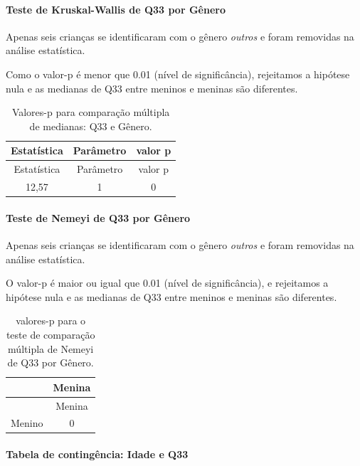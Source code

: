 \documentclass[]{article}
\let\oldparagraph\paragraph
\renewcommand{\paragraph}[1]{\oldparagraph{#1}\mbox{}}
\begin{document}
\hypertarget{teste-de-kruskal-wallis-de-q33-por-guxeanero}{%
\paragraph{Teste de Kruskal-Wallis de Q33 por Gênero}\label{teste-de-kruskal-wallis-de-q33-por-guxeanero}}

Apenas seis crianças se identificaram com o gênero \emph{outros} e foram removidas na análise estatística.

Como o valor-p é menor que 0.01 (nível de significância), rejeitamos a hipótese nula e as medianas de Q33 entre meninos e meninas são diferentes.

\begin{longtable}[]{@{}ccc@{}}
\caption{\label{tab:unnamed-chunk-1150}Valores-p para comparação múltipla de medianas: Q33 e Gênero.}\tabularnewline
\toprule
Estatística & Parâmetro & valor p\tabularnewline
\midrule
\endfirsthead
\toprule
Estatística & Parâmetro & valor p\tabularnewline
\midrule
\endhead
12,57 & 1 & 0\tabularnewline
\bottomrule
\end{longtable}

\hypertarget{teste-de-nemeyi-de-q33-por-guxeanero}{%
\paragraph{Teste de Nemeyi de Q33 por Gênero}\label{teste-de-nemeyi-de-q33-por-guxeanero}}

Apenas seis crianças se identificaram com o gênero \emph{outros} e foram removidas na análise estatística.

O valor-p é maior ou igual que 0.01 (nível de significância), e rejeitamos a hipótese nula e as medianas de Q33 entre meninos e meninas são diferentes.

\begin{longtable}[]{@{}lc@{}}
\caption{\label{tab:unnamed-chunk-1152}valores-p para o teste de comparação múltipla de Nemeyi de Q33 por Gênero.}\tabularnewline
\toprule
& Menina\tabularnewline
\midrule
\endfirsthead
\toprule
& Menina\tabularnewline
\midrule
\endhead
Menino & 0\tabularnewline
\bottomrule
\end{longtable}

\cleardoublepage

\hypertarget{tabela-de-continguxeancia-idade-e-q33}{%
\paragraph{Tabela de contingência: Idade e Q33}\label{tabela-de-continguxeancia-idade-e-q33}}
\end{document}
